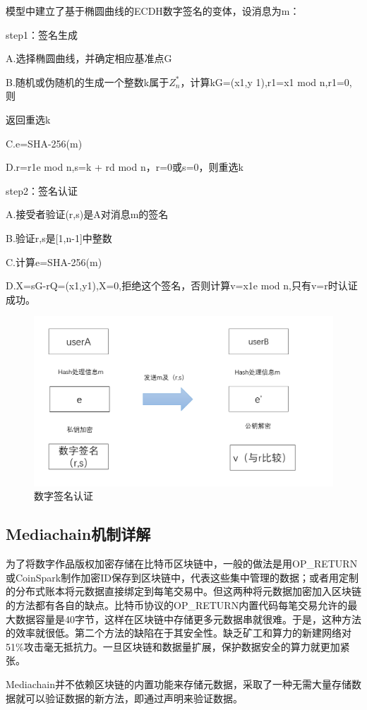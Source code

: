 \documentclass[withoutpreface,bwprint]{cumcmthesis} %
\begin{document}
模型中建立了基于椭圆曲线的ECDH数字签名的变体，设消息为m：

step1：签名生成

A.选择椭圆曲线，并确定相应基准点G

B.随机或伪随机的生成一个整数k属于$Z_n^*$，计算kG=(x1,y
1),r1=x1 mod n,r1=0,则

返回重选k

C.e=SHA-256(m)

D.r=r1e mod n,s=k + rd mod n，r=0或s=0，则重选k

step2：签名认证

A.接受者验证(r,s)是A对消息m的签名

B.验证r,s是[1,n-1]中整数

C.计算e=SHA-256(m)

D.X=sG-rQ=(x1,y1),X=0,拒绝这个签名，否则计算v=x1e mod n,只有v=r时认证成功。

\begin{figure}[ht]
	\centering
	\includegraphics[width=.8\textwidth]{shu.png}
	\caption{数字签名认证}
\end{figure}

\subsection{Mediachain机制详解}
为了将数字作品版权加密存储在比特币区块链中，一般的做法是用OP\_RETURN或CoinSpark制作加密ID保存到区块链中，代表这些集中管理的数据；或者用定制的分布式账本将元数据直接绑定到每笔交易中。但这两种将元数据加密加入区块链的方法都有各自的缺点。比特币协议的OP\_RETURN内置代码每笔交易允许的最大数据容量是40字节，这样在区块链中存储更多元数据串就很难。于是，这种方法的效率就很低。第二个方法的缺陷在于其安全性。缺乏矿工和算力的新建网络对51\%攻击毫无抵抗力。一旦区块链和数据量扩展，保护数据安全的算力就更加紧张。

Mediachain并不依赖区块链的内置功能来存储元数据，采取了一种无需大量存储数据就可以验证数据的新方法，即通过声明来验证数据。
\end{document}
